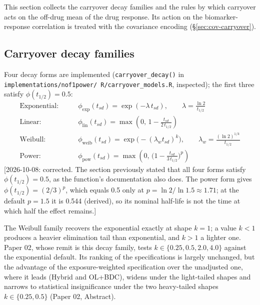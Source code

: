 \documentclass[11pt]{article}
\newcommand{\note}[1]{\textcolor{blue!60!black}{\small [#1]}}
\newcommand{\code}[1]{\texttt{#1}}
\begin{document}
This section collects the carryover decay families and the rules by
which carryover acts on the off-drug mean of the drug response. Its
action on the biomarker-response correlation is treated with the
covariance encoding (\S\ref{sec:cov-carryover}).

\subsection{Carryover decay families}

Four decay forms are implemented (\code{carryover\_decay()} in
\code{implementations/\allowbreak nof1power/\allowbreak
R/\allowbreak carryover\_models.R}, inspected); the
first three satisfy $\phi(t_{1/2}) = 0.5$:
\begin{align}
\text{Exponential:} \qquad & \phi_{\exp}(t_{sd}) = \exp(-\lambda\,
  t_{sd}), \qquad \lambda = \frac{\ln 2}{t_{1/2}}
  \label{eq:decay-exp} \\
\text{Linear:} \qquad & \phi_{\mathrm{lin}}(t_{sd}) = \max\!\left(0,\,
  1 - \frac{t_{sd}}{2\,t_{1/2}}\right)
  \label{eq:decay-lin} \\
\text{Weibull:} \qquad & \phi_{\mathrm{weib}}(t_{sd}) =
  \exp\!\big(-(\lambda_w t_{sd})^k\big), \qquad \lambda_w =
  \frac{(\ln 2)^{1/k}}{t_{1/2}}
  \label{eq:decay-weib} \\
\text{Power:} \qquad & \phi_{\mathrm{pow}}(t_{sd}) = \max\!\left(0,\,
  \Big(1 - \frac{t_{sd}}{3\,t_{1/2}}\Big)^{\!p}\right)
  \label{eq:decay-pow}
\end{align}
\note{2026-10-08: corrected. The section previously stated that all
four forms satisfy $\phi(t_{1/2}) = 0.5$, as the function's
documentation also does. The power form gives $\phi(t_{1/2}) =
(2/3)^p$, which equals 0.5 only at $p = \ln 2/\ln 1.5 \approx 1.71$;
at the default $p = 1.5$ it is 0.544 (derived), so its nominal
half-life is not the time at which half the effect remains.}

The Weibull family recovers the exponential exactly at shape $k=1$; a
value $k<1$ produces a heavier elimination tail than exponential, and
$k>1$ a lighter one. Paper 02, whose remit is this decay family, tests
$k \in \{0.25, 0.5, 2.0, 4.0\}$ against the exponential default. Its
ranking of the specifications is largely unchanged, but the advantage
of the exposure-weighted specification over the unadjusted one, where
it leads (Hybrid and OL+BDC), widens under the light-tailed shapes and
narrows to statistical insignificance under the two heavy-tailed
shapes $k \in \{0.25, 0.5\}$ (Paper 02, Abstract).
\end{document}
